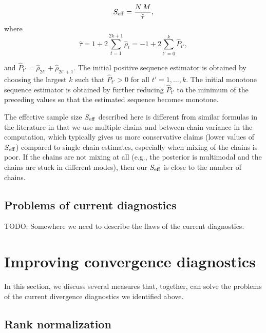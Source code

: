 \documentclass[american,]{article}
\begin{document}
\begin{equation}
S_{\rm eff} = \frac{N \, M}{\hat{\tau}},
\end{equation} where \begin{equation}
\hat{\tau} = 1 + 2 \sum_{t=1}^{2k+1} \hat{\rho}_t = 
-1 + 2 \sum_{t'=0}^{k} \hat{P}_{t'},
\end{equation}

and \(\hat{P}_{t'}=\hat{\rho}_{2t'}+\hat{\rho}_{2t'+1}\). The initial
positive sequence estimator is obtained by choosing the largest \(k\)
such that \(\hat{P}_{t'}>0\) for all \(t' = 1,\ldots,k\). The initial
monotone sequence estimator is obtained by further reducing
\(\hat{P}_{t'}\) to the minimum of the preceding values so that the
estimated sequence becomes monotone.

The effective sample size \(S_{\rm eff}\) described here is different
from similar formulas in the literature in that we use multiple chains
and between-chain variance in the computation, which typically gives us
more conservative claims (lower values of \(S_{\rm eff}\)) compared to
single chain estimates, especially when mixing of the chains is poor. If
the chains are not mixing at all (e.g., the posterior is multimodal and
the chains are stuck in different modes), then our \(S_{\rm eff}\) is
close to the number of chains.

\hypertarget{problems-of-current-diagnostics}{%
\subsection{Problems of current
diagnostics}\label{problems-of-current-diagnostics}}

TODO: Somewhere we need to describe the flaws of the current
diagnostics.

\hypertarget{improving-convergence-diagnostics}{%
\section{Improving convergence
diagnostics}\label{improving-convergence-diagnostics}}

In this section, we discuss several measures that, together, can solve
the problems of the current divergence diagnostics we identified above.

\hypertarget{rank-normalization}{%
\subsection{Rank normalization}\label{rank-normalization}}
\end{document}
